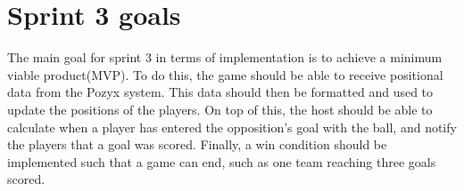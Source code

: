 \section{Sprint 3 goals}
The main goal for sprint 3 in terms of implementation is to achieve a minimum viable product(MVP).
To do this, the game should be able to receive positional data from the Pozyx system.
This data should then be formatted and used to update the positions of the players.
On top of this, the host should be able to calculate when a player has entered the opposition's goal with the ball, and notify the players that a goal was scored.
Finally, a win condition should be implemented such that a game can end, such as one team reaching three goals scored.
